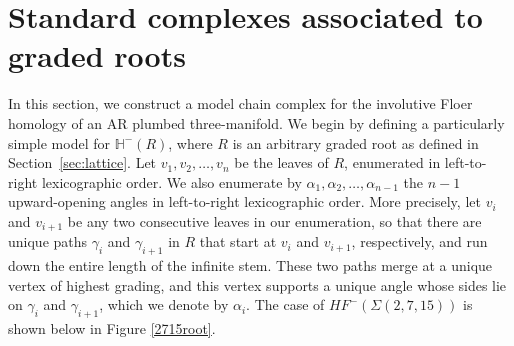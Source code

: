 \documentclass[11 pt]{amsart}
\theoremstyle{remark}
\def\He{\mathbb{H}}
\def\HF {\mathit{HF}}
\newcommand \HFm {\HF^-}
\begin{document}
\section{Standard complexes associated to graded roots}
\label{sec:standard}
In this section, we construct a model chain complex for the involutive Floer homology of an AR plumbed three-manifold. We begin by defining a particularly simple model for $\He^-(R)$, where $R$ is an arbitrary graded root as defined in Section~\ref{sec:lattice}. Let $v_1, v_2, \ldots, v_n$ be the leaves of $R$, enumerated in left-to-right lexicographic order. We also enumerate by $\alpha_1, \alpha_2, \ldots, \alpha_{n-1}$ the $n-1$ upward-opening angles in left-to-right lexicographic order. More precisely, let $v_i$ and $v_{i+1}$ be any two consecutive leaves in our enumeration, so that there are unique paths $\gamma_i$ and $\gamma_{i+1}$ in $R$ that start at $v_i$ and $v_{i+1}$, respectively, and run down the entire length of the infinite stem. These two paths merge at a unique vertex of highest grading, and this vertex supports a unique angle whose sides lie on $\gamma_i$ and $\gamma_{i+1}$, which we denote by $\alpha_i$. The case of $\HFm(\Sigma(2, 7, 15))$ is shown below in Figure \ref{2715root}. 
\end{document}
